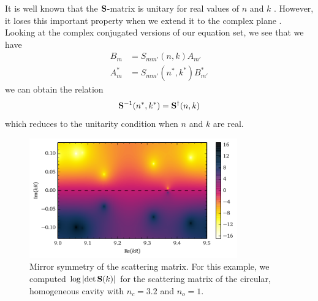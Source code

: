 It is well known that the $\mathbf{S}$-matrix is unitary 
for real values of $n$ and $k$ \cite{NEW1982,LER2013}. However, 
it loses this important property when we extend it
to the complex plane \cite{MUG2004}. Looking at the complex conjugated versions
of our equation set, we see that we have
  \begin{align*}
    B_m		&= S_{mm'}(n,k)A_{m'}	\\
    A_m^*	&= S_{mm'}(n^*,k^*)B_{m'}^*
  \end{align*}
we can obtain the relation
  \begin{equation}
    \label{eq:passive.formalism.generalizedSmatrix}
    \mathbf{S}^{-1}(n^*,k^*) = \mathbf{S}^\dagger(n,k)
  \end{equation}
which reduces to the unitarity condition when 
$n$ and $k$ are real. 

\begin{figure}
 \centering
 \includegraphics[width=0.8\textwidth]{figs/passive/determinantSmatrix.pdf}
 \caption[Mirror symmetry of the scattering matrix]
	 {Mirror symmetry of the scattering matrix. For this example, 
	 we computed $\log\left|\det\mathbf{S}(k)\right|$ for the scattering matrix of the
	 circular, homogeneous cavity with $n_c=3.2$ and $n_o=1$.}
  \label{fig:passive.formalism.symmetrySmatrix}
\end{figure}

